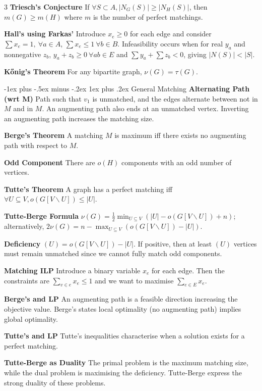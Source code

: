 \documentclass[10pt, landscape]{article}
\makeatletter
\renewcommand{\subsection}{\@startsection{subsection}{3}{0mm}%
                                {-1ex plus -.5ex minus -.2ex}%
                                {1ex plus .2ex}%
                                {\normalfont\small\bfseries}}%
\makeatother
\begin{document}
\begin{multicols*}{3}
\textbf{Triesch's Conjecture} If $\forall S\subset A,|N_G(S)| \geq |N_H(S)|$, then $m(G) \geq m(H)$ where $m$ is the number of perfect matchings.

\textbf{Hall's using Farkas'} Introduce $x_e \geq 0$ for each edge and consider $\sum x_e=1,\ \forall a \in A$, $\sum x_e \leq 1 \ \forall b \in B$. Infeasibility occurs when for real $y_a$ and nonnegative $z_b$, $y_a+z_b \geq 0\ \forall ab \in E$ and $\sum y_a + \sum z_b <0$, giving $|N(S)|<|S|$.

\textbf{Kőnig's Theorem} For any bipartite graph, $\nu(G)=\tau(G)$.

\subsection{General Matching}
\textbf{Alternating Path (wrt M)} Path such that $v_1$ is unmatched, and the edges alternate between not in $M$ and in $M$. An augmenting path also ends at an unmatched vertex. Inverting an augmenting path increases the matching size.

\textbf{Berge's Theorem} A matching $M$ is maximum iff there exists no augmenting path with respect to $M$.

\textbf{Odd Component} There are $o(H)$ components with an odd number of vertices.

\textbf{Tutte's Theorem} A graph has a perfect matching iff $\forall U \subseteq V, o(G[V\backslash U]) \leq |U|$.

\textbf{Tutte-Berge Formula} $\nu(G)=\frac{1}{2}\min_{U \subseteq V}(|U|-o(G[V \backslash U])+n)$; alternatively, $2\nu(G)=n-\max_{U \subseteq V}(o(G[V \backslash U])-|U|)$.

\textbf{Deficiency} $(U)=o(G[V \backslash U])-|U|$. If positive, then at least $(U)$ vertices must remain unmatched since we cannot fully match odd components.

\textbf{Matching ILP} Introduce a binary variable $x_e$ for each edge. Then the constraints are $\sum_{v \in e}x_e \leq 1$ and we want to maximise $\sum_{e \in E} x_e$.

\textbf{Berge's and LP} An augmenting path is a feasible direction increasing the objective value. Berge's states local optimality (no augmenting path) implies global optimality.

\textbf{Tutte's and LP} Tutte's inequalities characterise when a solution exists for a perfect matching.

\textbf{Tutte-Berge as Duality} The primal problem is the maximum matching size, while the dual problem is maximising the deficiency. Tutte-Berge express the strong duality of these problems.


\end{multicols*}
\end{document}
